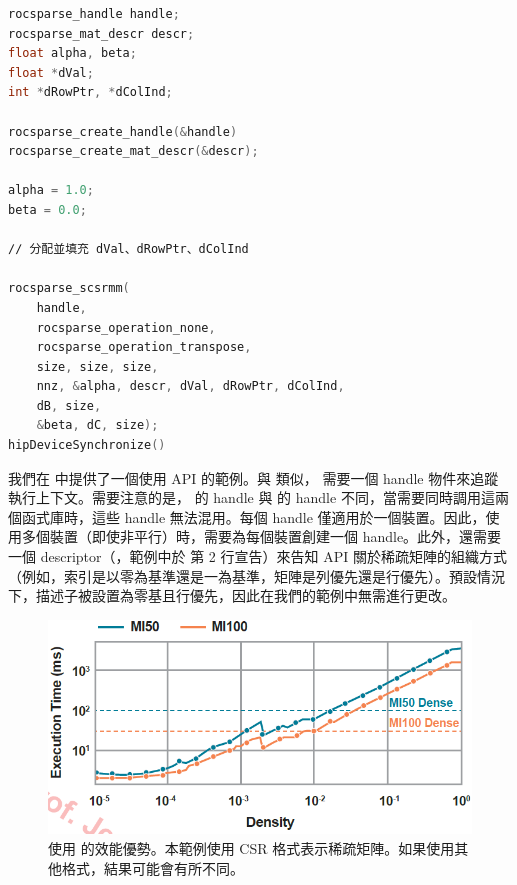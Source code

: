 \begin{lstlisting}[language=C, caption={使用 \term{rocSPARSE} 進行矩陣乘法的範例。一個矩陣以 CSR 格式表示，另一個矩陣以密集矩陣表示。為簡化起見，錯誤處理和記憶體釋放的程式碼已被省略。}, captionpos=t, label={lst:CSR}]
rocsparse_handle handle;
rocsparse_mat_descr descr;
float alpha, beta;
float *dVal;
int *dRowPtr, *dColInd;

rocsparse_create_handle(&handle)
rocsparse_create_mat_descr(&descr);

alpha = 1.0;
beta = 0.0;

∕∕ 分配並填充 dVal、dRowPtr、dColInd

rocsparse_scsrmm(
    handle,
    rocsparse_operation_none,
    rocsparse_operation_transpose,
    size, size, size,
    nnz, &alpha, descr, dVal, dRowPtr, dColInd,
    dB, size,
    &beta, dC, size);
hipDeviceSynchronize()
\end{lstlisting}

我們在  中提供了一個使用  API 的範例。與  類似， 需要一個 handle 物件來追蹤執行上下文。需要注意的是， 的 handle 與  的 handle 不同，當需要同時調用這兩個函式庫時，這些 handle 無法混用。每個 handle 僅適用於一個裝置。因此，使用多個裝置（即使非平行）時，需要為每個裝置創建一個 handle。此外，還需要一個 descriptor（，範例中於  第 2 行宣告）來告知 API 關於稀疏矩陣的組織方式（例如，索引是以零為基準還是一為基準，矩陣是列優先還是行優先）。預設情況下，描述子被設置為零基且行優先，因此在我們的範例中無需進行更改。

\begin{figure}[h]
    \centering
    \includegraphics[width=0.9\linewidth]{FileAusiliari/Screenshots/Figure9-2.png}
    \caption{使用  的效能優勢。本範例使用 CSR 格式表示稀疏矩陣。如果使用其他格式，結果可能會有所不同。}
    \label{fig:CSR}
\end{figure}

